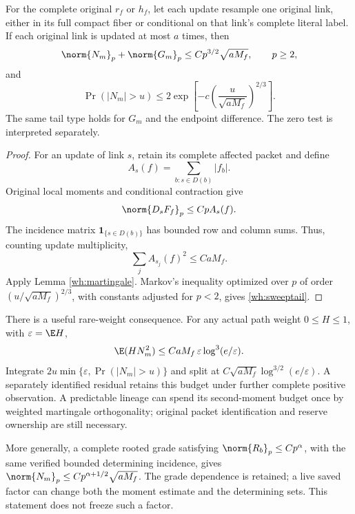 \begin{corollary}
\label{wh:sweep}
For the complete original \(r_f\) or \(h_f\), let each update resample one original link, either in its full compact fiber or conditional on that link's complete literal label. If each original link is updated at most \(a\) times, then
\begin{equation}
 \norm{N_m}_p+\norm{G_m}_p
 \le Cp^{3/2}\sqrt{aM_f},\qquad p\ge2,
 \label{wh:sweeplp}
\end{equation}
and
\begin{equation}
 \Pr(|N_m|>u)
 \le2\exp\!\left[-c\left(\frac{u}{\sqrt{aM_f}}\right)^{2/3}\right].
 \label{wh:sweeptail}
\end{equation}
The same tail type holds for \(G_m\) and the endpoint difference. The zero test is interpreted separately.
\end{corollary}
\begin{proof}
For an update of link \(s\), retain its complete affected packet and define
\[
 A_s(f)=\sum_{b:s\in D(b)}|f_b|.
\]
Original local moments and conditional contraction give
\[
 \norm{D_sF_f}_p\le Cp A_s(f).
\]
The incidence matrix \(\mathbf1_{\{s\in D(b)\}}\) has bounded row and column sums. Thus, counting update multiplicity,
\[
 \sum_jA_{s_j}(f)^2\le CaM_f.
\]
Apply Lemma \ref{wh:martingale}. Markov's inequality optimized over
\(p\) of order \((u/\sqrt{aM_f})^{2/3}\), with constants adjusted for \(p<2\), gives \eqref{wh:sweeptail}.
\end{proof}

There is a useful rare-weight consequence. For any actual path weight \(0\le H\le1\), with \(\varepsilon=\E H\),
\begin{equation}
 \E(HN_m^2)
 \le CaM_f\,\varepsilon\log^3(e/\varepsilon).
 \label{wh:rare}
\end{equation}
Integrate \(2u\min\{\varepsilon,\Pr(|N_m|>u)\}\) and split at
\(C\sqrt{aM_f}\log^{3/2}(e/\varepsilon)\). A separately identified residual retains this budget under further complete positive observation. A predictable lineage can spend its second-moment budget once by weighted martingale orthogonality; original packet identification and reserve ownership are still necessary.

More generally, a complete rooted grade satisfying
\(\norm{R_b}_p\le Cp^\alpha\), with the same verified bounded determining incidence, gives
\(\norm{N_m}_p\le Cp^{\alpha+1/2}\sqrt{aM_f}\).
The grade dependence is retained; a live saved factor can change both the moment estimate and the determining sets. This statement does not freeze such a factor.

